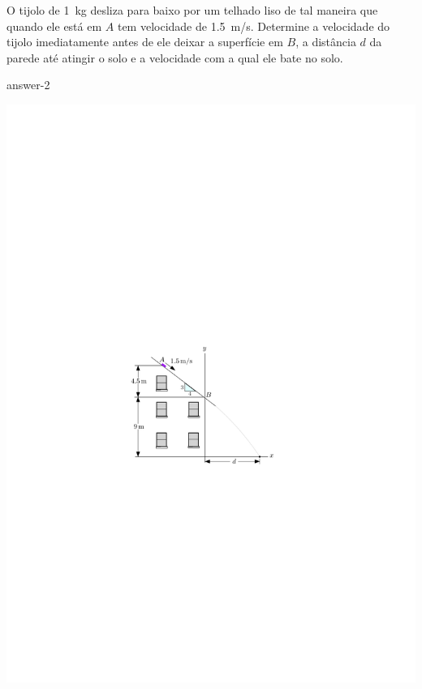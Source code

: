
\item O tijolo de \SI{1}{\kilogram} desliza para baixo por um telhado liso de tal maneira que quando ele está em $A$ tem velocidade de \SI{1.5}{\meter/\second}. Determine a velocidade do tijolo imediatamente antes de ele deixar a superfície em $B$, a distância $d$ da parede até atingir o solo e a velocidade com a qual ele bate no solo.

{answer-2}

\vspace{-2.3cm}
\begin{flushright}
    \includegraphics[scale=1.2]{images/draw_2.pdf}
\end{flushright}
